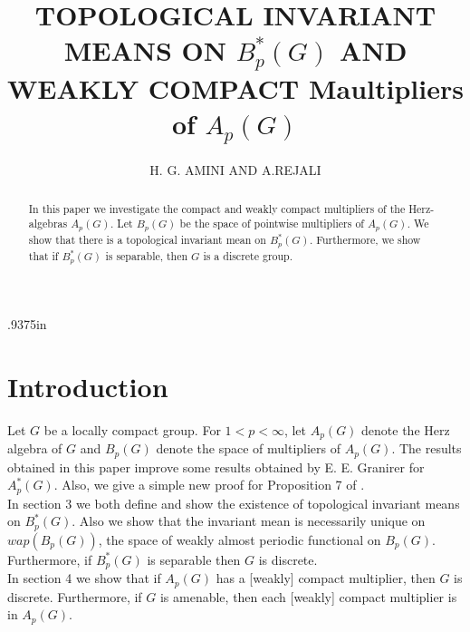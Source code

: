 
\usepackage{amsmath, amsthm, amscd, amsfonts, amssymb, graphicx, color}
\usepackage[bookmarksnumbered, colorlinks, plainpages]{hyperref}
\usepackage{enumitem}

\makeatletter \oddsidemargin.9375in \evensidemargin \oddsidemargin
{} \makeatother

\newtheorem{theorem}{Theorem}[section]
\newtheorem{lemma}[theorem]{Lemma}
\newtheorem{proposition}[theorem]{Proposition}
\newtheorem{corollary}[theorem]{Corollary}
\theoremstyle{definition}
\newtheorem{definition}[theorem]{Definition}
\newtheorem{example}[theorem]{Example}
\newtheorem{xca}[theorem]{Exercise}
\theoremstyle{remark}
\newtheorem{remark}[theorem]{Remark}
\theoremstyle{approach}
\newtheorem{approach}[theorem]{Approach}



\setcounter{page}{1}

\title[TOPOLOGICAL INVARIANT MEANS ON $B^*_p(G)$ AND WEAKLY COMPACT Maultipliers of $A_p(G)$ ]{TOPOLOGICAL INVARIANT MEANS ON $B^*_p(G)$ AND WEAKLY COMPACT Maultipliers of $A_p(G)$}

\author[H. G. AMINI AND A.REJALI]{H. G. AMINI AND A.REJALI}


\begin{abstract}
In this paper we investigate the compact and weakly compact multipliers of the Herz-algebras $A_p(G)$. Let $B_p(G)$ be the space of pointwise multipliers of $A_p(G)$. We show that there is a topological invariant mean on $B^*_p (G)$. Furthermore, we show that if $B^*_p(G)$ is separable, then $G$ is a discrete group.
\end{abstract}

\maketitle

\section{Introduction}
Let $G$ be a locally compact group. For $1 < p < \infty$, let $A_p(G)$ denote the Herz algebra of $G$ and $B_p(G)$ denote the space of multipliers of $A_p(G)$. The results obtained in this paper improve some results obtained by E. E. Granirer \cite{6} for $A^*_p(G)$. Also, we give a simple new proof for Proposition 7 of \cite{6}.\\
\indent
In section 3 we both define and show the existence of topological invariant means on $B^*_p(G)$. Also we show that the invariant mean is necessarily unique on $wap(B_p(G))$, the space of weakly almost periodic functional on $B_p(G)$. Furthermore, if $B^*_p(G)$ is separable then $G$ is discrete. \\
\indent
In section 4 we show that if $A_p(G)$ has a [weakly] compact multiplier, then $G$ is discrete. Furthermore, if $G$ is amenable, then each [weakly] compact multiplier is in $A_p(G)$.
